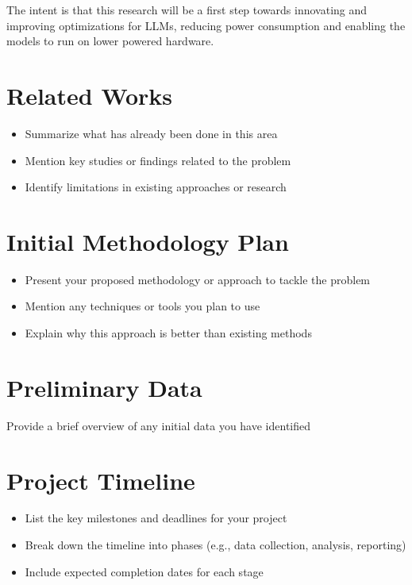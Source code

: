 \documentclass{article}
\begin{document}
The intent is that this research will be a first step towards innovating and improving optimizations for LLMs, reducing power consumption and enabling the models to run on lower powered hardware.

\section*{Related Works}
\begin{itemize}
    \item Summarize what has already been done in this area
    \item Mention key studies or findings related to the problem
    \item Identify limitations in existing approaches or research
\end{itemize}

\section*{Initial Methodology Plan}
\begin{itemize}
    \item Present your proposed methodology or approach to tackle the problem
    \item Mention any techniques or tools you plan to use
    \item Explain why this approach is better than existing methods
\end{itemize}


\section*{Preliminary Data}
Provide a brief overview of any initial data you have identified


\section*{Project Timeline}
\begin{itemize}
    \item List the key milestones and deadlines for your project
    \item Break down the timeline into phases (e.g., data collection, analysis, reporting)
    \item Include expected completion dates for each stage
\end{itemize}




\end{document}
